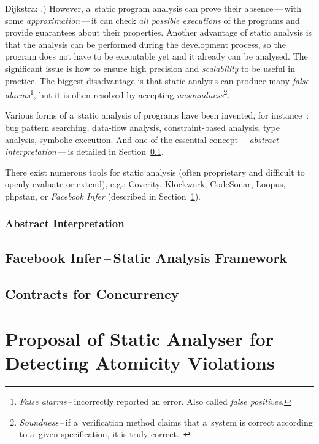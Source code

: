 Dijkstra: .) However, a~static program analysis 
can prove their absence\,---\,with some \emph{approximation}\,---\,it can 
check \emph{all possible executions} of the programs and provide guarantees
about their properties. Another advantage of static analysis is that the
analysis can be performed during the development process, so the program
does not have to be executable yet and it already can be analysed.
The significant issue is how to ensure high precision and
\emph{scalability} to be useful in practice. The biggest disadvantage is
that static analysis can produce many \emph{false alarms}\footnote{
\emph{False alarms}\,--\,incorrectly reported an error. Also called 
\emph{false positives}.}, but it is often
resolved by accepting \emph{unsoundness}\footnote{\emph{Soundness}\,--\,if
a~verification method claims that a~system is correct according to a~given
specification, it is truly correct.~\cite{favStaticAnalysis}}.

Various forms of a~static analysis of programs have been invented, for
instance~\cite{favStaticAnalysis}: bug pattern searching, data-flow 
analysis, constraint-based analysis, type analysis, symbolic execution. And 
one of the essential concept\,---\,\emph{abstract interpretation}\,---\,is
detailed in Section~\ref{sec:ai}.

There exist numerous tools for static analysis (often proprietary and
difficult to openly evaluate or extend), e.g.: Coverity, Klockwork, CodeSonar,
Loopus, phpstan, or \emph{Facebook Infer} (described in
Section~\ref{sec:fbinfer}).


\subsection{Abstract Interpretation}
\label{sec:ai}


\section{\texorpdfstring{Facebook Infer\,--\,Static Analysis Framework}{}}
\label{sec:fbinfer}


\section{Contracts for Concurrency}
\label{sec:contracts}



\chapter{Proposal of Static Analyser for Detecting Atomicity Violations}
\label{chap:proposal}



